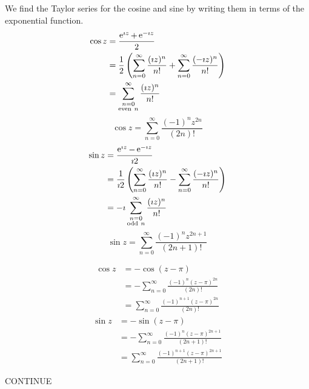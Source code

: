 {\begin{Solution}
  We find the Taylor series for the cosine and sine by writing them in 
  terms of the exponential function.
  \begin{align*}
    \cos z &= \frac{\mathop{\mathrm{e}}\nolimits^{\imath z} + \mathop{\mathrm{e}}\nolimits^{-\imath z}}{2}
    \\
    &= \frac{1}{2} \left( \sum_{n = 0}^\infty \frac{(\imath z)^n}{n!} 
      + \sum_{n = 0}^\infty \frac{(- \imath z)^n}{n!} \right)
    \\
    &= \sum_{\substack{n = 0 \\ \mathrm{even}\ n}}^\infty \frac{(\imath z)^n}{n!} 
  \end{align*}
  \[
  \boxed{
    \cos z = \sum_{n = 0}^\infty \frac{(-1)^n z^{2 n}}{(2 n)!} 
    }
  \]
  \begin{align*}
    \sin z &= \frac{\mathop{\mathrm{e}}\nolimits^{\imath z} - \mathop{\mathrm{e}}\nolimits^{-\imath z}}{\imath 2}
    \\
    &= \frac{1}{\imath 2} \left( \sum_{n = 0}^\infty \frac{(\imath z)^n}{n!} 
      - \sum_{n = 0}^\infty \frac{(- \imath z)^n}{n!} \right)
    \\
    &= - \imath \sum_{\substack{n = 0 \\ \mathrm{odd}\ n}}^\infty \frac{(\imath z)^n}{n!} 
  \end{align*}
  \[
  \boxed{
    \sin z = \sum_{n = 0}^\infty \frac{(-1)^n z^{2 n + 1}}{(2 n + 1)!} 
    }
  \]
\end{Solution}



\begin{Solution}
  \label{solution taylor cosine sine}
  \begin{align*}
    \cos z 
    &= - \cos(z - \pi)
    \\
    &= - \sum_{n = 0}^\infty \frac{(-1)^n (z - \pi)^{2 n}}{(2 n)!} 
    \\
    &= \sum_{n = 0}^\infty \frac{(-1)^{n+1} (z - \pi)^{2 n}}{(2 n)!} 
  \end{align*}
  \begin{align*}
    \sin z 
    &= - \sin(z - \pi)
    \\
    &= - \sum_{n = 0}^\infty \frac{(-1)^n (z - \pi)^{2 n + 1}}{(2 n + 1)!} 
    \\
    &= \sum_{n = 0}^\infty \frac{(-1)^{n+1} (z - \pi)^{2 n + 1}}{(2 n + 1)!} 
  \end{align*}
\end{Solution}



\begin{Solution}
  \label{solution sum taylor series}
  CONTINUE
\end{Solution}


}
